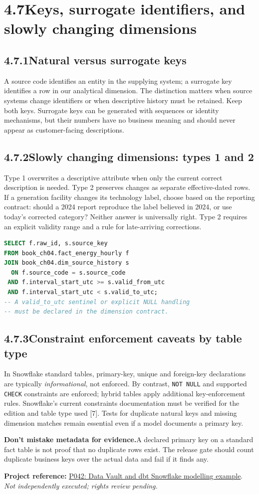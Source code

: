 \documentclass[11pt,twoside]{article}
\newcommand{\topic}[2]{\subsection*{#1\quad #2}}
\newcommand{\repo}[2]{\par\begingroup\fontsize{8.0}{9.6}\selectfont\sffamily\color{inkgray}\textbf{Project reference:} \href{#2}{#1}. \textit{Not independently executed; rights review pending.}\par\endgroup}
\begin{document}
\newpage
\section*{4.7\quad Keys, surrogate identifiers, and slowly changing dimensions}
\topic{4.7.1}{Natural versus surrogate keys}
A source code identifies an entity in the supplying system; a surrogate key identifies a row in our analytical dimension. The distinction matters when source systems change identifiers or when descriptive history must be retained. Keep both keys. Surrogate keys can be generated with sequences or identity mechanisms, but their numbers have no business meaning and should never appear as customer-facing descriptions.

\topic{4.7.2}{Slowly changing dimensions: types 1 and 2}
Type 1 overwrites a descriptive attribute when only the current correct description is needed. Type 2 preserves changes as separate effective-dated rows. If a generation facility changes its technology label, choose based on the reporting contract: should a 2024 report reproduce the label believed in 2024, or use today's corrected category? Neither answer is universally right. Type 2 requires an explicit validity range and a rule for late-arriving corrections.

\begin{lstlisting}[language=SQL,caption={Type 2 lookup: half-open validity interval.}]
SELECT f.raw_id, s.source_key
FROM book_ch04.fact_energy_hourly f
JOIN book_ch04.dim_source_history s
  ON f.source_code = s.source_code
 AND f.interval_start_utc >= s.valid_from_utc
 AND f.interval_start_utc < s.valid_to_utc;
-- A valid_to_utc sentinel or explicit NULL handling
-- must be declared in the dimension contract.
\end{lstlisting}

\topic{4.7.3}{Constraint enforcement caveats by table type}
In Snowflake standard tables, primary-key, unique and foreign-key declarations are typically \emph{informational}, not enforced. By contrast, \texttt{NOT NULL} and supported \texttt{CHECK} constraints are enforced; hybrid tables apply additional key-enforcement rules. Snowflake's current constraints documentation must be verified for the edition and table type used [7]. Tests for duplicate natural keys and missing dimension matches remain essential even if a model documents a primary key.

\begin{insight}\textbf{Don't mistake metadata for evidence.}\quad A declared primary key on a standard fact table is not proof that no duplicate rows exist. The release gate should count duplicate business keys over the actual data and fail if it finds any.\end{insight}
\repo{P042: Data Vault and dbt Snowflake modelling example}{https://github.com/ScalefreeCOM/datavault4dbt-snowflake-demo}
\end{document}
